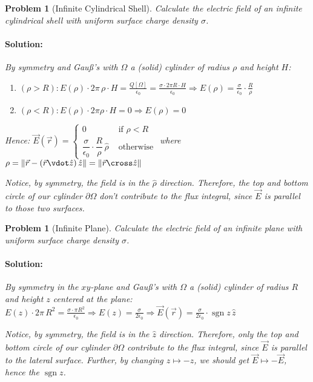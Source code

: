 \documentclass[12pt]{article}
\let\RA\Rightarrow
\DeclareMathOperator{\sgn}{sgn}
\newcommand*{\rv}{\vec{r}}
\newcommand*{\vE}{\vec{E}}
\newcommand*{\ee}{\epsilon_0}
\newtheorem{problem}[theorem]{Problem}
\newenvironment{solution}{\paragraph{Solution:}}{\hfill}
\begin{document}
\begin{problem}[Infinite Cylindrical Shell]
  Calculate the electric field of an infinite cylindrical shell with uniform surface charge density $\sigma$.
  \begin{solution}
    By symmetry and Gauß's with $\Omega$ a (solid) cylinder of radius $\rho$ and height $H$:
    \begin{enumerate}
      \item $\displaystyle (\rho>R):E(\rho)\cdot 2\pi\,\rho\cdot H=\frac{Q[\Omega]}{\ee}=\frac{\sigma\cdot 2\pi R\cdot H}{\ee}\RA E(\rho)=\frac{\sigma}{\ee}\cdot\frac{R}{\rho}$
      \item $\displaystyle (\rho<R):E(\rho)\cdot 2\pi\rho\cdot H=0\RA E(\rho)=0$
    \end{enumerate}
    Hence: $\displaystyle \vE(\rv)=\begin{cases}
      0 &\text{ if }\rho<R\\\dfrac{\sigma}{\ee}\cdot\dfrac{R}{\rho}\,\hat{\rho}&\text{ otherwise}
    \end{cases}$ where $\rho=\|\rv-(\rv\vdot\hat{z})\,\hat{z}\|=\|\rv\cross\hat{z}\|$

    \noindent Notice, by symmetry, the field is in the $\hat{\rho}$ direction. Therefore, the top and bottom circle of our cylinder $\partial\Omega$ don't contribute to the flux integral, since $\vE$ is parallel to those two surfaces.
  \end{solution}
\end{problem}

\begin{problem}[Infinite Plane]
  Calculate the electric field of an infinite plane with uniform surface charge density $\sigma$.
  \begin{solution}
    By symmetry in the $xy$-plane and Gauß's with $\Omega$ a (solid) cylinder of radius $R$ and height $z$ centered at the plane: $\displaystyle E(z)\cdot 2\pi\,R^2=\frac{\sigma\cdot \pi R^2}{\ee}\RA E(z)=\frac{\sigma}{2\ee}\RA \vE(\rv)=\frac{\sigma}{2\ee}\cdot\sgn{z}\,\hat{z}$

    \noindent Notice, by symmetry, the field is in the $\hat{z}$ direction. Therefore, only the top and bottom circle of our cylinder $\partial\Omega$ contribute to the flux integral, since $\vE$ is parallel to the lateral surface. Further, by changing $z\mapsto-z$, we should get $\vE\mapsto -\vE$, hence the $\sgn{z}$.
  \end{solution}
\end{problem}
\end{document}
